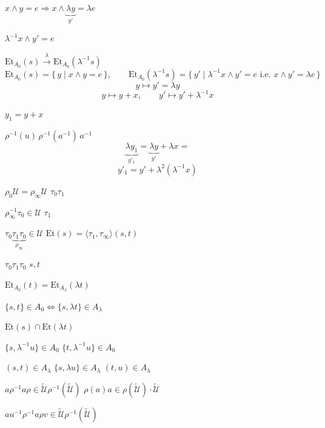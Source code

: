 \documentclass[11pt,a4paper]{article}
\begin{document}
$x\wedge y = e \Longrightarrow x\wedge \underbrace{\lambda y}_{y'} = \lambda e$

$\lambda^{-1}x\wedge y' = e$


$\mathrm{Et}_{A_0}(s) \xrightarrow{\ \lambda\ } \mathrm{Et}_{A_0}(\lambda^{-1}s)$
\[
  \mathrm{Et}_{A_0}(s) = \{\,y \mid x\wedge y = e\,\}, \qquad
  \mathrm{Et}_{A_0}(\lambda^{-1}s) = \{\,y' \mid \lambda^{-1}x\wedge y' = e \text{ i.e. } x\wedge y' = \lambda e\,\}
\]
\[
  y \longmapsto y' = \lambda y
\]
\[
  y \mapsto y + x, \qquad y' \longmapsto y' + \lambda^{-1}x
\]

 $y_1 = y + x$ \qquad {}

$\rho^{-1}(u)\,\rho^{-1}(a^{-1})\,a^{-1}$
\[
  \underbrace{\lambda y_1}_{y'_1} = \underbrace{\lambda y}_{y'} + \lambda x =
\]
\[
  y'_1 = y' + \lambda^{2}(\lambda^{-1}x)
\]


$\rho_0\mathcal{U} = \rho_\infty\mathcal{U}$ \qquad $\tau_0\tau_1$

$\rho_\infty^{-1}\tau_0\in\mathcal{U}$ \qquad $\tau_1$

$\tau_0\underbrace{\tau_1\tau_0}_{\rho_\infty}\in\mathcal{U}$ \qquad $\mathrm{Et}(s) = \langle\tau_1,\tau_\infty\rangle(s,t)$

$\tau_0\tau_1\tau_0$ \qquad $s,t$

$\mathrm{Et}_{A_0}(t) = \mathrm{Et}_{A_\lambda}(\lambda t)$

$\{s,t\}\in A_0 \Longleftrightarrow \{s,\lambda t\}\in A_\lambda$

$\mathrm{Et}(s)\cap\mathrm{Et}(\lambda t)$

$\{s,\lambda^{-1}u\}\in A_0$ \qquad $\{t,\lambda^{-1}u\}\in A_0$

$(s,t)\in A_\lambda$ \qquad $\{s,\lambda u\}\in A_\lambda$ \qquad $(t,u)\in A_\lambda$

$a\rho^{-1}a\rho\in\widetilde{\mathcal{U}}\rho^{-1}(\widetilde{\mathcal{U}})$ \qquad $\rho(a)a\in\rho(\widetilde{\mathcal{U}})\cdot\widetilde{\mathcal{U}}$


$au^{-1}\rho^{-1}a\rho v\in\widetilde{\mathcal{U}}\rho^{-1}(\widetilde{\mathcal{U}})$
\end{document}
